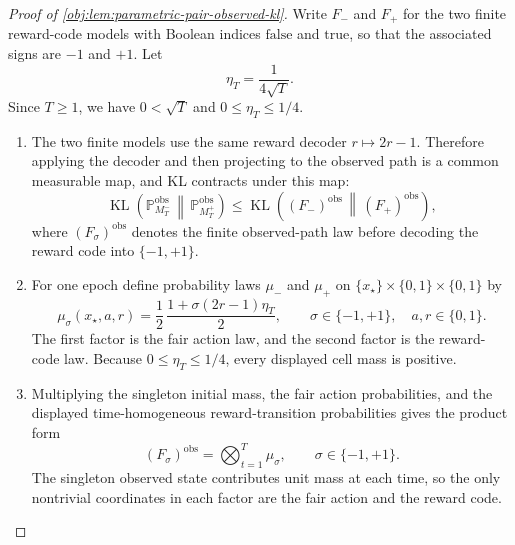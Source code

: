 \begin{proof}[Proof of \cref{obj:lem:parametric-pair-observed-kl}]
Write \(F_{-}\) and \(F_{+}\) for the two finite reward-code models with Boolean indices
\(\mathrm{false}\) and \(\mathrm{true}\), so that the associated signs are \(-1\) and \(+1\).  Let
\[
        \eta_T=\frac{1}{4\sqrt T}.
\]
Since \(T\ge 1\), we have \(0<\sqrt T\) and \(0\le \eta_T\le 1/4\).

\begin{enumerate}
\item
The two finite models use the same reward decoder \(r\mapsto 2r-1\).  Therefore applying the decoder
and then projecting to the observed path is a common measurable map, and KL contracts under this map:
\[
\operatorname{KL}\!\left(
\mathbb P^{\mathrm{obs}}_{M_T^-}
\,\middle\|\,
\mathbb P^{\mathrm{obs}}_{M_T^+}
\right)
\le
\operatorname{KL}\!\left(
(F_-)^{\mathrm{obs}}
\,\middle\|\,
(F_+)^{\mathrm{obs}}
\right),
\]
where \((F_\sigma)^{\mathrm{obs}}\) denotes the finite observed-path law before decoding the reward
code into \(\{-1,+1\}\). %

\item
For one epoch define probability laws \(\mu_{-}\) and \(\mu_{+}\) on
\(\{x_\star\}\times\{0,1\}\times\{0,1\}\) by
\[
\mu_\sigma(x_\star,a,r)
=
\frac12\,
\frac{1+\sigma(2r-1)\eta_T}{2},
\qquad
\sigma\in\{-1,+1\},\quad a,r\in\{0,1\}.
\]
The first factor is the fair action law, and the second factor is the reward-code law.  Because
\(0\le \eta_T\le 1/4\), every displayed cell mass is positive. %

\item
Multiplying the singleton initial mass, the fair action probabilities, and the displayed
time-homogeneous reward-transition probabilities gives the product form
\[
(F_\sigma)^{\mathrm{obs}}
=
\bigotimes_{t=1}^{T}\mu_\sigma,
\qquad \sigma\in\{-1,+1\}.
\]
The singleton observed state contributes unit mass at each time, so the only nontrivial coordinates in
each factor are the fair action and the reward code. %


\end{enumerate}
\end{proof}

